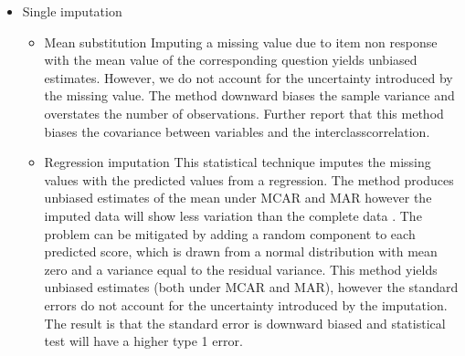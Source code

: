  \begin{itemize} 
\item Single imputation
\begin{itemize}
\item Mean substitution
Imputing a missing value due to item non response with the mean value of the corresponding question yields unbiased estimates. However, we do not account for the uncertainty introduced by the missing value. The method downward biases the sample variance and  overstates the number of observations. Further \cite{schafer2002missing} report that this method biases the covariance between variables and the interclasscorrelation. 
\item  Regression imputation
This statistical technique imputes the missing values with the predicted values from a regression. The method produces unbiased estimates of the mean under MCAR and MAR however the imputed data will show less variation than the complete data \cite{baraldi2010introduction}. The problem can be mitigated by adding a random component to each predicted score, which is drawn from a normal distribution with mean zero and a variance equal to the residual variance. This method yields unbiased estimates (both under MCAR and MAR), however the standard errors do not account for the uncertainty introduced by the imputation. The result is that the standard error is downward biased and statistical test will have a higher type 1 error. 
 \end{itemize}  

\end{itemize}  
